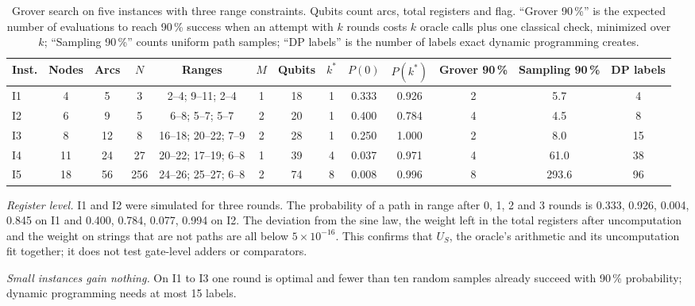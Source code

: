 \documentclass[journal]{IEEEtran}
\begin{document}
\begin{table}[t]
\caption{Grover search on five instances with three range constraints. Qubits count arcs, total registers and flag. ``Grover 90\,\%'' is the expected number of evaluations to reach 90\,\% success when an attempt with $k$ rounds costs $k$ oracle calls plus one classical check, minimized over $k$; ``Sampling 90\,\%'' counts uniform path samples; ``DP labels'' is the number of labels exact dynamic programming creates.}
\label{tab:groverinstances}
\centering
\footnotesize
\setlength{\tabcolsep}{3.5pt}
\begin{tabular}{lcccccccccccc}
\hline \hline
\textbf{Inst.} & \textbf{Nodes} & \textbf{Arcs} & \textbf{$N$} & \textbf{Ranges} & \textbf{$M$} & \textbf{Qubits} & \textbf{$k^{*}$} & \textbf{$P(0)$} & \textbf{$P(k^{*})$} & \textbf{Grover 90\,\%} & \textbf{Sampling 90\,\%} & \textbf{DP labels} \\
\hline
I1 & 4 & 5 & 3 & 2--4; 9--11; 2--4 & 1 & 18 & 1 & 0.333 & 0.926 & 2 & 5.7 & 4 \\
I2 & 6 & 9 & 5 & 6--8; 5--7; 5--7 & 2 & 20 & 1 & 0.400 & 0.784 & 4 & 4.5 & 8 \\
I3 & 8 & 12 & 8 & 16--18; 20--22; 7--9 & 2 & 28 & 1 & 0.250 & 1.000 & 2 & 8.0 & 15 \\
I4 & 11 & 24 & 27 & 20--22; 17--19; 6--8 & 1 & 39 & 4 & 0.037 & 0.971 & 4 & 61.0 & 38 \\
I5 & 18 & 56 & 256 & 24--26; 25--27; 6--8 & 2 & 74 & 8 & 0.008 & 0.996 & 8 & 293.6 & 96 \\
\hline \hline
\end{tabular}
\end{table}

\emph{Register level.} I1 and I2 were simulated for three rounds. The probability of a path in range after 0, 1, 2 and 3 rounds is 0.333, 0.926, 0.004, 0.845 on I1 and 0.400, 0.784, 0.077, 0.994 on I2. The deviation from the sine law, the weight left in the total registers after uncomputation and the weight on strings that are not paths are all below $5\times10^{-16}$. This confirms that $U_{S}$, the oracle's arithmetic and its uncomputation fit together; it does not test gate-level adders or comparators.

\emph{Small instances gain nothing.} On I1 to I3 one round is optimal and fewer than ten random samples already succeed with 90\,\% probability; dynamic programming needs at most 15 labels.
\end{document}
